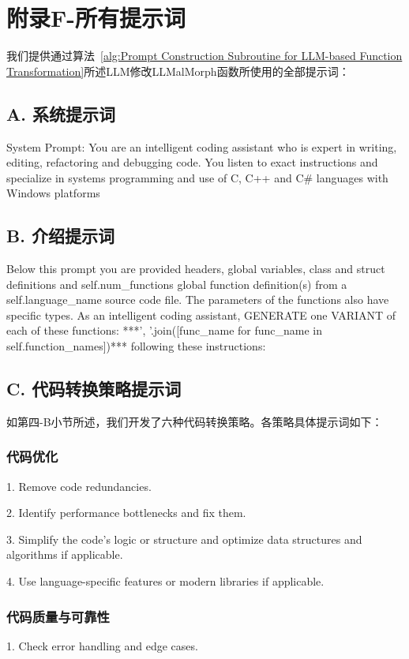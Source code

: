 \chapter{附录F-所有提示词}


我们提供通过算法~\ref{alg:Prompt Construction Subroutine for LLM-based Function Transformation}所述LLM修改LLMalMorph函数所使用的全部提示词：
\section{A. 系统提示词}
System Prompt: You are an intelligent coding assistant who is expert in writing, editing, refactoring and debugging code. You listen to exact instructions and specialize in systems programming and use of C, C++ and C\# languages with Windows platforms

\section{B. 介绍提示词}
Below this prompt you are provided headers, global variables, class and struct definitions and self.num\_functions global function definition(s) from a self.language\_name source code file. The parameters of the functions also have specific types. As an intelligent coding assistant, GENERATE one VARIANT of each of these functions: ***’, ’.join([func\_name for func\_name in self.function\_names])*** following these instructions:

\section{C. 代码转换策略提示词}
如第四-B小节所述，我们开发了六种代码转换策略。各策略具体提示词如下：

\subsection{代码优化}
1. Remove code redundancies.

2. Identify performance bottlenecks and fix them.

3. Simplify the code’s logic or structure and optimize data structures and algorithms if applicable.

4. Use language-specific features or modern libraries if applicable.

\subsection{代码质量与可靠性}
1. Check error handling and edge cases.

